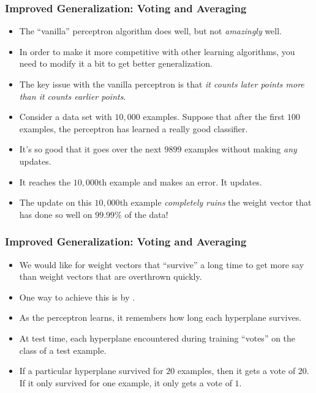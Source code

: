 \documentclass[trans]{beamer}
\begin{document}
\fi
\begin{frame}
  \frametitle{Improved Generalization: Voting and Averaging}
\begin{itemize}
\item The
``vanilla'' perceptron algorithm does well, but not \emph{amazingly}
well.  
\item In order to make it more competitive with other learning
algorithms, you need to modify it a bit to get better generalization.
\item The key issue with the vanilla perceptron is that \emph{it counts
  later points more than it counts earlier points}.
\item Consider a data set with $10,000$ examples.  Suppose that
after the first $100$ examples, the perceptron has learned a really
good classifier. 
\item It's so good that it goes over the next $9899$
examples without making \emph{any} updates.  
\item It reaches the $10,000$th
example and makes an error.  It updates.  
\item The update
on this $10,000$th example \emph{completely ruins} the weight vector
that has done so well on $99.99\%$ of the data!
\end{itemize}
\end{frame}
\begin{frame}
  \frametitle{Improved Generalization: Voting and Averaging}
\begin{itemize}
\item 
We would like for weight vectors that ``survive'' a long time
to get more say than weight vectors that are overthrown quickly. 
\item One
way to achieve this is by . 
\item As the perceptron learns,
it remembers how long each hyperplane survives.
\item  At test time, each
hyperplane encountered during training ``votes'' on the class of a
test example. 
\item  If a particular hyperplane survived for $20$ examples,
then it gets a vote of $20$.  If it only survived for one example, it
only gets a vote of $1$.  
\end{itemize}
\end{frame}
\end{document}
